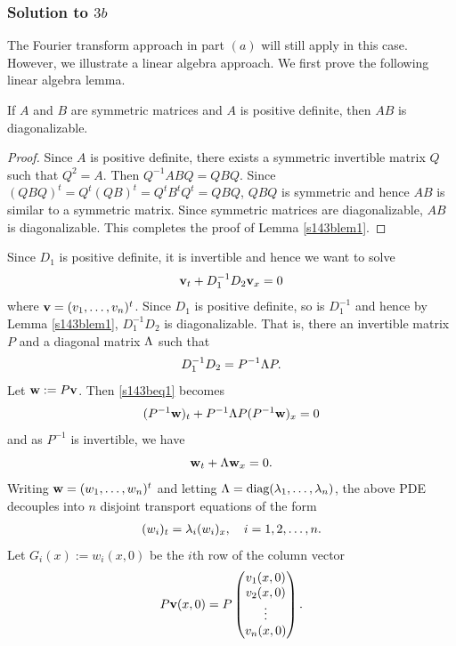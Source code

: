 \subsubsection*{Solution to $3b$}
The Fourier transform approach in part $(a)$ will still apply in this case. However, we illustrate a linear algebra approach.
We first prove the following linear algebra lemma.
\begin{lemma}\label{s143blem1}
If $A$ and $B$ are symmetric matrices and $A$ is positive definite, then $AB$ is diagonalizable.
\end{lemma}
\begin{proof}
Since $A$ is positive definite, there exists a symmetric invertible matrix $Q$ such that $Q^{2} = A$.
Then $Q^{-1}ABQ = QBQ$. Since $(QBQ)^{t} = Q^{t}(QB)^{t} = Q^{t}B^{t}Q^{t} = QBQ$, $QBQ$ is symmetric and
hence $AB$ is similar to a symmetric matrix. Since symmetric matrices are diagonalizable, $AB$ is diagonalizable.
This completes the proof of Lemma \ref{s143blem1}.
\end{proof}
Since $D_{1}$ is positive definite, it is invertible and hence we want to solve
\begin{align}\label{s143beq1}
\mathbf{v}_{t} + D_{1}^{-1}D_{2}\mathbf{v}_{x} = 0
\end{align}
where $\mathbf{v} = (v_{1}, \ldots, v_{n})^{t}$.
Since $D_{1}$ is positive definite, so is $D_{1}^{-1}$ and hence by Lemma \ref{s143blem1},
$D_{1}^{-1}D_{2}$ is diagonalizable. That is, there an invertible matrix $P$ and a diagonal matrix $\Lambda$ such that
\begin{align}\label{s14pdef}
D_{1}^{-1}D_{2} = P^{-1}\Lambda P.
\end{align}
Let $\mathbf{w} := P\mathbf{v}$. Then \eqref{s143beq1} becomes
\begin{align*}
(P^{-1}\mathbf{w})_{t} + P^{-1}\Lambda P(P^{-1}\mathbf{w})_{x} = 0
\end{align*}
and as $P^{-1}$ is invertible, we have
$$\mathbf{w}_{t} + \Lambda \mathbf{w}_{x} = 0.$$
Writing $\mathbf{w} = (w_{1}, \ldots, w_{n})^{t}$ and letting $\Lambda = \textrm{diag}(\lambda_{1}, \ldots, \lambda_{n})$, the above PDE decouples
into $n$ disjoint transport equations of the form
\begin{align}\label{s143beq2}
(w_{i})_{t} = \lambda_{i}(w_{i})_{x}, \quad i = 1, 2, \ldots, n.
\end{align}
Let $G_{i}(x) := w_{i}(x, 0)$ be the $i$th row of the column vector
\begin{align}\label{s14pfmat}
P\mathbf{v}(x, 0) = P\begin{pmatrix}
v_{1}(x, 0)\\
v_{2}(x, 0)\\
\vdots\\
v_{n}(x, 0)
\end{pmatrix}.
\end{align}
